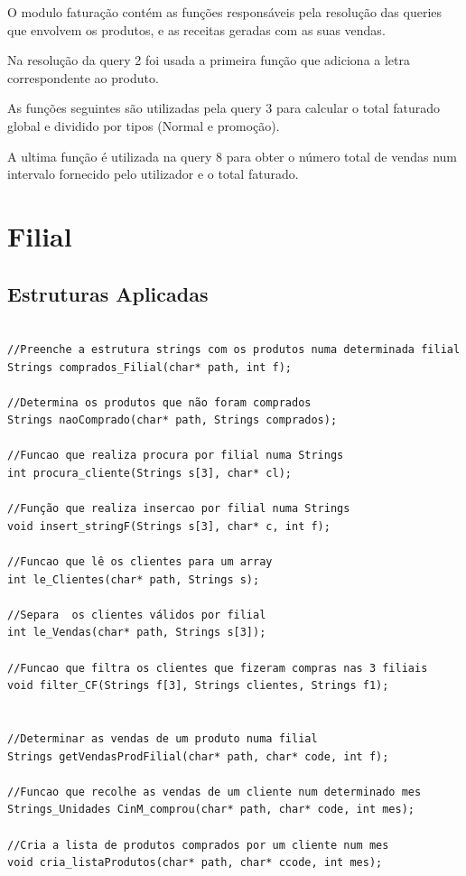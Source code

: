 \documentclass[a4paper]{report} %
\begin{document}
\par
\par O modulo faturação contém as funções responsáveis pela resolução das queries que envolvem os produtos, e as receitas geradas com as suas vendas. 
\par Na resolução da query 2 foi usada a primeira função que adiciona a letra correspondente ao produto.
\par As funções seguintes são utilizadas pela query 3 para calcular o total faturado global e dividido por tipos (Normal e promoção).
\par A ultima função é utilizada na query 8 para obter o número total de vendas num intervalo fornecido pelo utilizador e o total faturado.
\par 

\section{Filial}
\par
\subsection{Estruturas Aplicadas}
\begin{lstlisting}[style=CStyle]

//Preenche a estrutura strings com os produtos numa determinada filial
Strings comprados_Filial(char* path, int f);

//Determina os produtos que não foram comprados
Strings naoComprado(char* path, Strings comprados);

//Funcao que realiza procura por filial numa Strings
int procura_cliente(Strings s[3], char* cl);

//Função que realiza insercao por filial numa Strings
void insert_stringF(Strings s[3], char* c, int f);

//Funcao que lê os clientes para um array
int le_Clientes(char* path, Strings s);

//Separa  os clientes válidos por filial
int le_Vendas(char* path, Strings s[3]);

//Funcao que filtra os clientes que fizeram compras nas 3 filiais
void filter_CF(Strings f[3], Strings clientes, Strings f1);


//Determinar as vendas de um produto numa filial
Strings getVendasProdFilial(char* path, char* code, int f);

//Funcao que recolhe as vendas de um cliente num determinado mes
Strings_Unidades CinM_comprou(char* path, char* code, int mes);

//Cria a lista de produtos comprados por um cliente num mes
void cria_listaProdutos(char* path, char* ccode, int mes);


\end{lstlisting}
\end{document}

